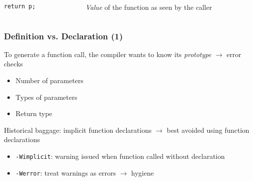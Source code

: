 \begin{frame}[fragile]
  \begin{block}{}
    \begin{columns}[c]
      \begin{column}{.5\textwidth}
        \begin{block}{}
\begin{verbatim}
return p;
\end{verbatim}
        \end{block}
      \end{column}
      \begin{column}{.4\textwidth}
        \textit{Value} of the function as seen by the caller
      \end{column}
    \end{columns}
  \end{block}

\end{frame}

\begin{frame}
  \frametitle{Definition vs. Declaration (1)}

  To generate a function call, the compiler wants to know its
  \textit{prototype} $\to$ error checks

  \begin{itemize}
  \item Number of parameters
  \item Types of parameters
  \item Return type
  \end{itemize}

  Historical baggage: implicit function declarations $\to$ best
  avoided using function declarations

  \begin{itemize}
  \item \texttt{-Wimplicit}: warning issued when function called
    without declaration
  \item \texttt{-Werror}: treat warnings as errors $\to$ hygiene
  \end{itemize}

\end{frame}

